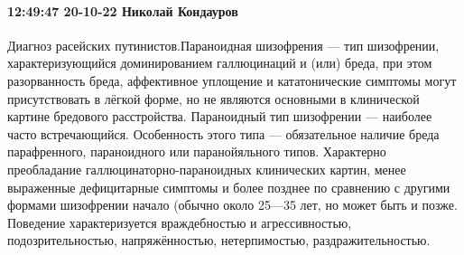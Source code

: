 \paragraph{12:49:47 20-10-22 Николай Кондауров}

Диагноз расейских путинистов.Парано‌идная шизофрени‌я — тип
шизофрении, характеризующийся доминированием галлюцинаций и (или) бреда, при
этом разорванность бреда, аффективное уплощение и кататонические симптомы могут
присутствовать в лёгкой форме, но не являются основными в клинической картине
бредового расстройства. Параноидный тип шизофрении — наиболее часто
встречающийся. Особенность этого типа — обязательное наличие бреда
парафренного, параноидного или паранойяльного типов. Характерно преобладание
галлюцинаторно-параноидных клинических картин, менее выраженные дефицитарные
симптомы и более позднее по сравнению с другими формами шизофрении начало
(обычно около 25—35 лет, но может быть и позже. Поведение характеризуется
враждебностью и агрессивностью, подозрительностью, напряжённостью,
нетерпимостью, раздражительностью.

